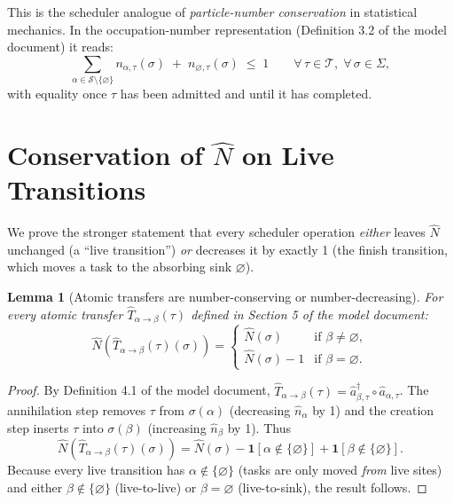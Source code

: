 \documentclass[11pt,a4paper]{article}
\newtheorem{lemma}[theorem]{Lemma}
\newcommand{\cre}[1]{\hat{a}^{\dagger}_{#1}}
\newcommand{\ann}[1]{\hat{a}_{#1}}
\newcommand{\num}[1]{\hat{n}_{#1}}
\newcommand{\Num}{\hat{N}}
\newcommand{\Trf}[2]{\hat{T}_{#1 \to #2}}
\begin{document}
This is the scheduler analogue of \emph{particle-number conservation}
in statistical mechanics.  In the occupation-number representation
(Definition 3.2 of the model document) it reads:
\[
  \sum_{\alpha \in \mathcal{S} \setminus \{\varnothing\}}
  n_{\alpha,\tau}(\sigma) \;+\; n_{\varnothing,\tau}(\sigma)
  \;\leq\; 1
  \qquad \forall\, \tau \in \mathcal{T},\; \forall\, \sigma \in \Sigma,
\]
with equality once $\tau$ has been admitted and until it has
completed.

\section{Conservation of $\Num$ on Live Transitions}

We prove the stronger statement that every scheduler operation
\emph{either} leaves $\Num$ unchanged (a ``live transition'') \emph{or}
decreases it by exactly 1 (the finish transition, which moves a task
to the absorbing sink $\varnothing$).

\begin{lemma}[Atomic transfers are number-conserving or number-decreasing]
\label{lem:atomicconserve}
For every atomic transfer $\Trf{\alpha}{\beta}(\tau)$ defined in
Section 5 of the model document:
\[
  \Num(\Trf{\alpha}{\beta}(\tau)(\sigma)) =
  \begin{cases}
    \Num(\sigma)     & \text{if } \beta \neq \varnothing, \\
    \Num(\sigma) - 1 & \text{if } \beta = \varnothing.
  \end{cases}
\]
\end{lemma}

\begin{proof}
By Definition 4.1 of the model document, $\Trf{\alpha}{\beta}(\tau) =
\cre{\beta,\tau} \circ \ann{\alpha,\tau}$.  The annihilation step
removes $\tau$ from $\sigma(\alpha)$ (decreasing $\num{\alpha}$ by 1)
and the creation step inserts $\tau$ into $\sigma(\beta)$ (increasing
$\num{\beta}$ by 1).  Thus
\[
  \Num(\Trf{\alpha}{\beta}(\tau)(\sigma))
  = \Num(\sigma) - \mathbf{1}[\alpha \notin \{\varnothing\}]
                 + \mathbf{1}[\beta \notin \{\varnothing\}].
\]
Because every live transition has $\alpha \notin \{\varnothing\}$
(tasks are only moved \emph{from} live sites) and either
$\beta \notin \{\varnothing\}$ (live-to-live) or $\beta = \varnothing$
(live-to-sink), the result follows.
\end{proof}
\end{document}
